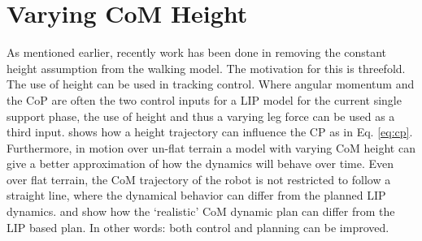 %
\chapter{Varying CoM Height}%
\label{chap:varyingheight}
As mentioned earlier, recently work has been done in removing the constant height assumption from the walking model. The motivation for this is threefold. The use of height can be used in tracking control. Where angular momentum and the \ac{CoP} are often the two control inputs for a \ac{LIP} model for the current single support phase, the use of height and thus a varying leg force can be used as a third input.  shows how a height trajectory can influence the \ac{CP} as in Eq. \eqref{eq:cp}. Furthermore, in motion over un-flat terrain a model with varying \ac{CoM} height can give a better approximation of how the dynamics will behave over time. Even over flat terrain, the \ac{CoM} trajectory of the robot is not restricted to follow a straight line, where the dynamical behavior can differ from the planned \ac{LIP} dynamics.  and  show how the `realistic' \ac{CoM} dynamic plan can differ from the \ac{LIP} based plan. In other words: both control and planning can be improved. 
